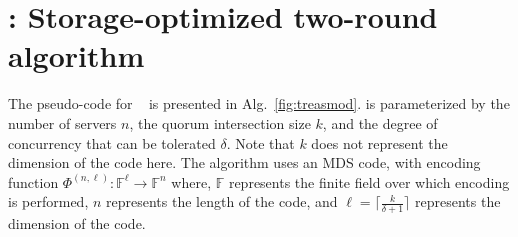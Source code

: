 \section{\treasmod: Storage-optimized two-round algorithm}\label{sec:treasmod}
The pseudo-code for  ~\treasmod{} is presented in  Alg.~\ref{fig:treasmod}. 
\treasmod{} is parameterized by the number of servers $n$, the quorum intersection size $k$, and the degree of concurrency that can be tolerated $\delta$. Note that $k$ does not represent the dimension of the code here. 
%
The algorithm uses an MDS code, with encoding function $\Phi^{(n,\ell)}: \mathbb{F}^{\ell} \rightarrow \mathbb{F}^{n}$ where, $\mathbb{F}$ represents the finite field over which encoding is performed, $n$ represents the length of the code, and $\ell = {\lceil \frac{k}{\delta+1} \rceil} $ represents the dimension of the code. 

%

